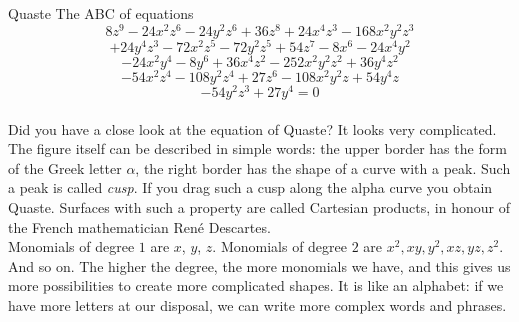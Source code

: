 \begin{surferPage}{Quaste}
The ABC of equations
  \smallskip
\[8z^9-24x^2z^6-24y^2z^6+36z^8+24x^4z^3-168x^2y^2z^3\]
\[+24y^4z^3-72x^2z^5-72y^2z^5+54z^7-8x^6-24x^4y^2\]
\[-24x^2y^4-8y^6 + 36x^4z^2-252x^2y^2z^2+36y^4z^2\]
\[- 54x^2z^4-108y^2z^4 + 27z^6-108x^2y^2z + 54y^4z\]
\[-54y^2z^3 + 27y^4 = 0\]\\
\vspace{0.3cm}
Did you have a close look at the equation of Quaste? It  looks very complicated.
The figure itself can be described in simple words: the upper border has the form of the Greek letter $\alpha$, the right border has the shape of a curve with a peak. Such a peak is called {\it cusp}. If you drag such a cusp along the alpha curve you obtain Quaste. Surfaces with such a property are called Cartesian products, in honour of the French mathematician  Ren\'e Descartes.\\
\vspace{0.3cm}
Monomials of degree $1$ are $x$, $y$, $z$. Monomials of degree $2$ are $x^2, xy, y^2, xz, yz, z^2$. And so on. The higher the degree, the more monomials we have, and this gives us more possibilities to create more complicated shapes. It is like an alphabet: if we have more letters at our disposal, we can write more complex words and phrases.
\end{surferPage}

